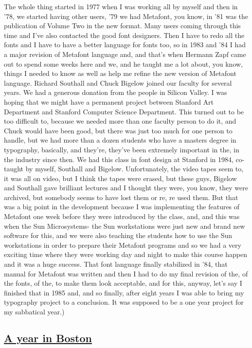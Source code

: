 \documentclass[]{article}
\begin{document}
The whole thing started in 1977 when I was working all by myself and
then in '78, we started having other users, '79 we had Metafont, you
know, in '81 was the publication of Volume Two in the new format. Many
users coming through this time and I've also contacted the good font
designers. Then I have to redo all the fonts and I have to have a better
language for fonts too, so in 1983 and '84 I had a major revision of
Metafont language and, and that's when Hermann Zapf came out to spend
some weeks here and we, and he taught me a lot about, you know, things I
needed to know as well as help me refine the new version of Metafont
language. Richard Southall and Chuck Bigelow joined our faculty for
several years. We had a generous donation from the people in Silicon
Valley. I was hoping that we might have a permanent project between
Stanford Art Department and Stanford Computer Science Department. This
turned out to be too difficult to, because we needed more than one
faculty person to do it, and Chuck would have been good, but there was
just too much for one person to handle, but we had more than a dozen
students who have a masters degree in typography, basically, and
they're, they've been extremely important in the, in the industry since
then. We had this class in font design at Stanford in 1984, co-taught by
myself, Southall and Bigelow. Unfortunately, the video tapes seem to, it
was all on video, but I think the tapes were erased, but these guys,
Bigelow and Southall gave brilliant lectures and I thought they were,
you know, they were archived, but somebody seems to have lost them or
re, re used them. But that was a big point in the development because I
was implementing the features of Metafont one week before they were
introduced by the class, and, and this was when the Sun Microsystems-
the Sun workstations were just new and brand new software for this, and
we were also teaching the students how to use the Sun workstations in
order to prepare their Metafont programs and so we had a very exciting
time where they were working day and night to make this course happen
and it was a huge success. That font language finally stabilized in '84,
that manual for Metafont was written and then I had to do my final
revision of the, of the fonts, of the, to make them look acceptable, and
for this, anyway, let's say I finished that in 1985 and, and so finally,
after eight years I was able to bring my typography project to a
conclusion. It was supposed to be a one year project for my sabbatical
year.)

\subsection{\texorpdfstring{\href{http://webofstories.com/play/17130}{A
year in Boston}}{A year in Boston}}\label{a-year-in-boston}
\end{document}
